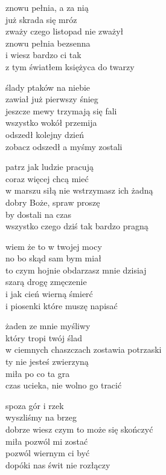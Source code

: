 \begin{text}
    znowu pełnia, a za nią\\
    już skrada się mróz	\\
    zważy czego listopad nie zważył\\
    znowu pełnia bezsenna\\
    i wiesz bardzo ci tak\\
    z tym światłem księżyca do twarzy

    \vin ślady ptaków na niebie\\
    \vin zawiał już pierwszy śnieg\\
    \vin jeszcze mewy trzymają się fali\\
    \vin wszystko wokół przemija\\
    \vin odszedł kolejny dzień\\
    \vin zobacz odszedł a myśmy zostali

    patrz jak ludzie pracują\\
    coraz więcej chcą mieć\\
    w marszu siłą nie wstrzymasz ich żadną\\
    dobry Boże, spraw proszę\\
    by dostali na czas\\
    wszystko czego dziś tak bardzo pragną

    \vin wiem że to w twojej mocy\\
    \vin no bo skąd sam bym miał\\
    \vin to czym hojnie obdarzasz mnie dzisiaj\\
    \vin szarą drogę zmęczenie\\
    \vin i jak cień wierną śmierć\\
    \vin i piosenki które muszę napisać

    żaden ze mnie myśliwy\\
    który tropi twój ślad\\
    w ciemnych chaszczach zostawia potrzaski\\
    ty nie jesteś zwierzyną\\
    miła po co ta gra\\
    czas ucieka, nie wolno go tracić

    \vin spoza gór i rzek\\
    \vin wyszliśmy na brzeg\\
    \vin dobrze wiesz czym to może się skończyć\\
    \vin miła pozwól mi zostać\\
    \vin pozwól wiernym ci być\\
    \vin dopóki nas świt nie rozłączy
\end{text}
